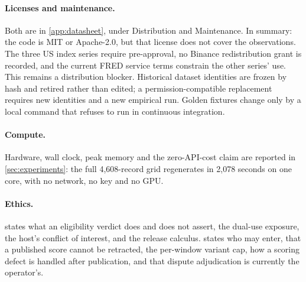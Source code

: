 \paragraph{Licenses and maintenance.} Both are in \cref{app:datasheet}, under Distribution and Maintenance. In summary: the code is MIT or Apache-2.0, but that license does not cover the observations. The three US index series require pre-approval, no Binance redistribution grant is recorded, and the current FRED service terms constrain the other series' use. This remains a distribution blocker. Historical dataset identities are frozen by hash and retired rather than edited; a permission-compatible replacement requires new identities and a new empirical run. Golden fixtures change only by a local command that refuses to run in continuous integration.

\paragraph{Compute.} Hardware, wall clock, peak memory and the zero-API-cost claim are reported in \cref{sec:experiments}: the full 4{,}608-record grid regenerates in 2{,}078 seconds on one core, with no network, no key and no GPU.

\paragraph{Ethics.}  states what an eligibility verdict does and does not assert, the dual-use exposure, the host's conflict of interest, and the release calculus.  states who may enter, that a published score cannot be retracted, the per-window variant cap, how a scoring defect is handled after publication, and that dispute adjudication is currently the operator's.
